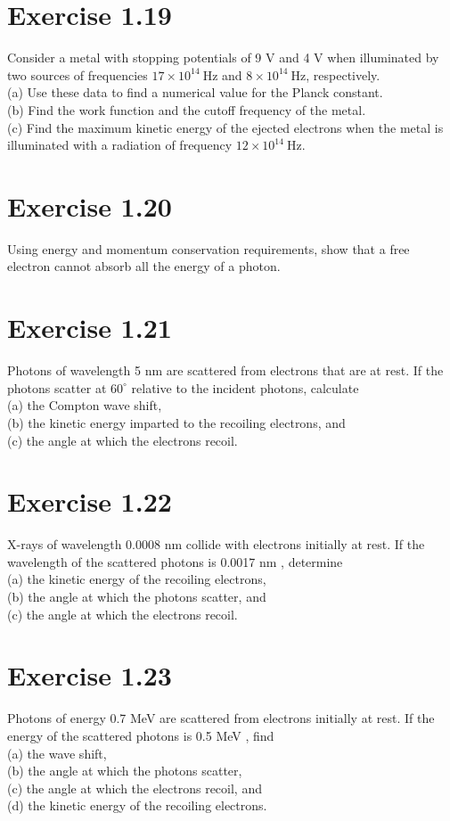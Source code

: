 \documentclass[10pt]{article}
\begin{document}
\section*{Exercise 1.19}
Consider a metal with stopping potentials of 9 V and 4 V when illuminated by two sources of frequencies $17 \times 10^{14} \mathrm{~Hz}$ and $8 \times 10^{14} \mathrm{~Hz}$, respectively.\\
(a) Use these data to find a numerical value for the Planck constant.\\
(b) Find the work function and the cutoff frequency of the metal.\\
(c) Find the maximum kinetic energy of the ejected electrons when the metal is illuminated with a radiation of frequency $12 \times 10^{14} \mathrm{~Hz}$.

\section*{Exercise 1.20}
Using energy and momentum conservation requirements, show that a free electron cannot absorb all the energy of a photon.

\section*{Exercise 1.21}
Photons of wavelength 5 nm are scattered from electrons that are at rest. If the photons scatter at $60^{\circ}$ relative to the incident photons, calculate\\
(a) the Compton wave shift,\\
(b) the kinetic energy imparted to the recoiling electrons, and\\
(c) the angle at which the electrons recoil.

\section*{Exercise 1.22}
X-rays of wavelength 0.0008 nm collide with electrons initially at rest. If the wavelength of the scattered photons is 0.0017 nm , determine\\
(a) the kinetic energy of the recoiling electrons,\\
(b) the angle at which the photons scatter, and\\
(c) the angle at which the electrons recoil.

\section*{Exercise 1.23}
Photons of energy 0.7 MeV are scattered from electrons initially at rest. If the energy of the scattered photons is 0.5 MeV , find\\
(a) the wave shift,\\
(b) the angle at which the photons scatter,\\
(c) the angle at which the electrons recoil, and\\
(d) the kinetic energy of the recoiling electrons.
\end{document}
